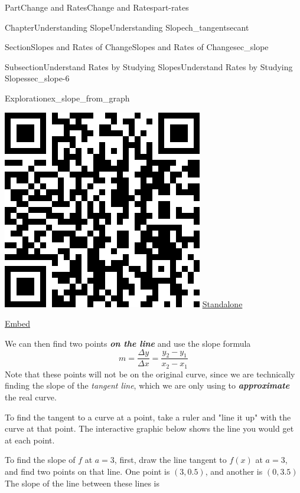 \documentclass{tufte-book}
\newcommand{\alert}[1]{\textbf{\textit{#1}}}
\numberwithin{equation}{chapter}
\begin{document}
\begin{partptx}{Part}{Change and Rates}{}{Change and Rates}{}{}{part-rates}
\begin{chapterptx}{Chapter}{Understanding Slope}{}{Understanding Slope}{}{}{ch_tangentsecant}
\begin{sectionptx}{Section}{Slopes and Rates of Change}{}{Slopes and Rates of Change}{}{}{sec_slope}
\begin{subsectionptx}{Subsection}{Understand Rates by Studying Slopes}{}{Understand Rates by Studying Slopes}{}{}{sec_slope-6}
\begin{exploration}{Exploration}{}{ex_slope_from_graph}
\begin{enumerate}[font=\bfseries,label=(\alph*),ref=\alph*]
\begin{sidebyside}{2}{0.075}{0.075}{0.17}
\begin{sbspanel}{0.21}
\includegraphics[width=\linewidth]{generated/qrcode/ex_slope_from_graph-4-2-2.png}
\href{http://webwork.bridgew.edu/oer/functions_at_work/ex_slope_from_graph-4-2-2.html}{Standalone}%
\par
\href{http://webwork.bridgew.edu/oer/functions_at_work/ex_slope_from_graph-4-2-2-if.html}{Embed}%
\end{sbspanel}%
\end{sidebyside}%
\par
We can then find two points \alert{on the line} and use the slope formula%
\begin{equation*}
m = \dfrac{\Delta y}{\Delta x} = \dfrac{y_2-y_1}{x_2-x_1}
\end{equation*}
Note that these points will not be on the original curve, since we are technically finding the slope of the \emph{tangent line}, which we are only using to \alert{approximate} the real curve.%
\par
To find the tangent to a curve at a point, take a ruler and "line it up" with the curve at that point. The interactive graphic below shows the line you would get at each point.%
\par
To find the slope of \(f\) at \(a=3\), first, draw the line tangent to \(f(x)\) at \(a=3\), and find two points on that line. One point is \((3,0.5)\), and another is \((0,3.5)\) The slope of the line between these lines is%

\end{enumerate}
\end{exploration}
\end{subsectionptx}
\end{sectionptx}
\end{chapterptx}
\end{partptx}
\end{document}
